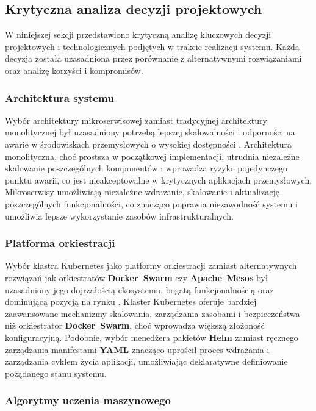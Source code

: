 \subsection{Krytyczna analiza decyzji projektowych}

W niniejszej sekcji przedstawiono krytyczną analizę kluczowych decyzji projektowych i technologicznych podjętych w trakcie realizacji systemu. Każda decyzja została uzasadniona przez porównanie z alternatywnymi rozwiązaniami oraz analizę korzyści i kompromisów.

\subsubsection{Architektura systemu}

Wybór architektury mikroserwisowej zamiast tradycyjnej architektury monolitycznej był uzasadniony potrzebą lepszej skalowalności i odporności na awarie w środowiskach przemysłowych o wysokiej dostępności \cite{microservice_benefits}. Architektura monolityczna, choć prostsza w początkowej implementacji, utrudnia niezależne skalowanie poszczególnych komponentów i wprowadza ryzyko pojedynczego punktu awarii, co jest nieakceptowalne w krytycznych aplikacjach przemysłowych. Mikroserwisy umożliwiają niezależne wdrażanie, skalowanie i aktualizację poszczególnych funkcjonalności, co znacząco poprawia niezawodność systemu i umożliwia lepsze wykorzystanie zasobów infrastrukturalnych.

\subsubsection{Platforma orkiestracji}

Wybór klastra Kubernetes jako platformy orkiestracji zamiast alternatywnych rozwiązań jak orkiestratów \textbf{\mbox{Docker Swarm}} czy \textbf{\mbox{Apache Mesos}} był uzasadniony jego dojrzałością ekosystemu, bogatą funkcjonalnością oraz dominującą pozycją na rynku \cite{kubernetes_benefits}. Klaster Kubernetes oferuje bardziej zaawansowane mechanizmy skalowania, zarządzania zasobami i bezpieczeństwa niż orkiestrator \textbf{\mbox{Docker Swarm}}, choć wprowadza większą złożoność konfiguracyjną. Podobnie, wybór menedżera pakietów \textbf{\mbox{Helm}} \cite{helm_docs} zamiast ręcznego zarządzania manifestami \textbf{YAML} \cite{yaml_spec} znacząco uprościł proces wdrażania i zarządzania cyklem życia aplikacji, umożliwiając deklaratywne definiowanie pożądanego stanu systemu.

\subsubsection{Algorytmy uczenia maszynowego}

